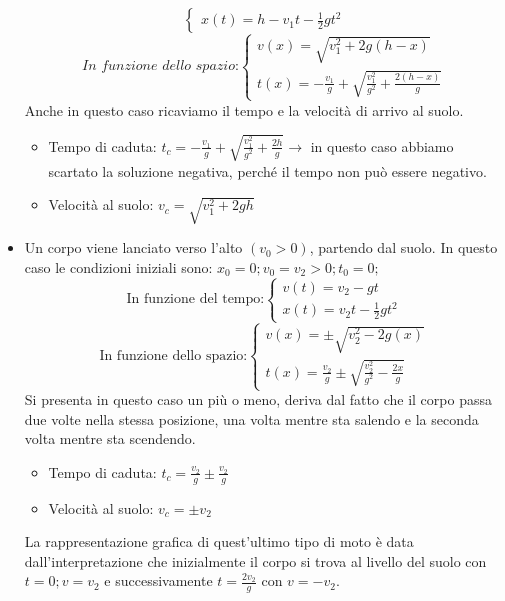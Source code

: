 \documentclass[a4paper,12pt]{report}
\begin{document}
\begin{itemize}
\begin{equation}
\begin{cases}
				x(t) = h - v_1t - \frac{1}{2}gt^2
			\end{cases}
		\end{equation}
		\begin{equation}
			\textit{In funzione dello spazio:}
			\begin{cases}
				v(x) = \sqrt{v_1^2 + 2g(h-x)}\\
				t(x) = -\frac{v_1}{g} + \sqrt{\frac{v_1^2}{g^2} + \frac{2(h-x)}{g}}
			\end{cases}
		\end{equation}
		Anche in questo caso ricaviamo il tempo e la velocità di arrivo al suolo.
		\begin{itemize}
			\item Tempo di caduta: $t_c = -\frac{v_1}{g} + \sqrt{\frac{v_1^2}{g^2} + \frac{2h}{g}}\rightarrow$ in questo caso abbiamo scartato la soluzione negativa, perché il tempo non può essere negativo.
			\item Velocità al suolo: $v_c = \sqrt{v_1^2 + 2gh}$
		\end{itemize}
		\item Un corpo viene lanciato verso l'alto $(v_0 > 0)$, partendo dal suolo. In questo caso le condizioni iniziali sono: $x_0 = 0;$\;\;\;$v_0 = v_2 > 0;$\;\;\;$t_0 = 0;$
		\begin{equation}
			\text{In funzione del tempo:}
			\begin{cases}
				v(t) = v_2 - gt\\
				x(t) = v_2t - \frac{1}{2}gt^2
			\end{cases}
		\end{equation}
		\begin{equation}
			\text{In funzione dello spazio:}
			\begin{cases}
				v(x) = \pm\sqrt{v_2^2 - 2g(x)}\\
				t(x) = \frac{v_2}{g}\pm\sqrt{\frac{v_2^2}{g^2} - \frac{2x}{g}}
			\end{cases}
		\end{equation}
		Si presenta in questo caso un più o meno, deriva dal fatto che il corpo passa due volte nella stessa posizione, una volta mentre sta salendo e la seconda volta mentre sta scendendo.
		\begin{itemize}
			\item Tempo di caduta: $t_c = \frac{v_2}{g}\pm\frac{v_2}{g}$
			\item Velocità al suolo: $v_c = \pm v_2$
		\end{itemize}
		La rappresentazione grafica di quest'ultimo tipo di moto è data dall'interpretazione che inizialmente il corpo si trova al livello del suolo con $t = 0;$\;\;\;$v = v_2$ e successivamente $t = \frac{2v_2}{g}$ con $v = -v_2$.

\end{itemize}
\end{document}
